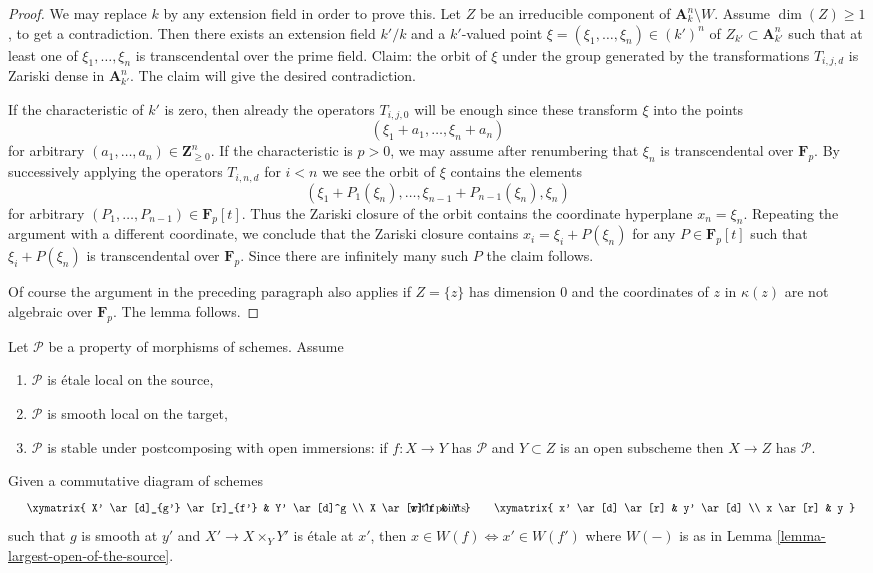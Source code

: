 \begin{proof}
We may replace $k$ by any extension field in order to prove this.
Let $Z$ be an irreducible component of $\mathbf{A}^n_k \setminus W$.
Assume $\dim(Z) \geq 1$, to get a contradiction.
Then there exists an extension field $k'/k$ and a $k'$-valued
point $\xi = (\xi_1, \ldots, \xi_n) \in (k')^n$ of
$Z_{k'} \subset \mathbf{A}^n_{k'}$
such that at least one of $\xi_1, \ldots, \xi_n$ is transcendental over the
prime field. Claim: the orbit of $\xi$ under the group generated by
the transformations $T_{i, j, d}$ is Zariski
dense in $\mathbf{A}^n_{k'}$. The claim will give the desired contradiction.

\medskip\noindent
If the characteristic of $k'$ is zero, then already the operators
$T_{i, j, 0}$ will be enough since these transform $\xi$ into
the points
$$
(\xi_1 + a_1, \ldots, \xi_n + a_n)
$$
for arbitrary $(a_1, \ldots, a_n) \in \mathbf{Z}_{\geq 0}^n$.
If the characteristic is $p > 0$, we may assume after renumbering
that $\xi_n$ is transcendental over $\mathbf{F}_p$. By
successively applying the operators $T_{i, n, d}$ for
$i < n$ we see the orbit of $\xi$ contains the elements
$$
(\xi_1 + P_1(\xi_n), \ldots, \xi_{n - 1} + P_{n - 1}(\xi_n), \xi_n)
$$
for arbitrary $(P_1, \ldots, P_{n - 1}) \in \mathbf{F}_p[t]$.
Thus the Zariski closure of the orbit contains the coordinate
hyperplane $x_n = \xi_n$. Repeating the argument with a different
coordinate, we conclude that the Zariski closure contains
$x_i = \xi_i + P(\xi_n)$ for any $P \in \mathbf{F}_p[t]$
such that $\xi_i + P(\xi_n)$ is transcendental over $\mathbf{F}_p$.
Since there are infinitely many such $P$ the claim follows.

\medskip\noindent
Of course the argument in the preceding paragraph also applies
if $Z = \{z\}$ has dimension $0$ and the coordinates of $z$
in $\kappa(z)$ are not algebraic over $\mathbf{F}_p$. The lemma follows.
\end{proof}

\begin{lemma}
\label{lemma-etale-tau-local-source-target}
Let $\mathcal{P}$ be a property of morphisms of schemes. Assume
\begin{enumerate}
\item $\mathcal{P}$ is \'etale local on the source,
\item $\mathcal{P}$ is smooth local on the target,
\item $\mathcal{P}$ is stable under postcomposing with open immersions:
if $f : X \to Y$ has $\mathcal{P}$ and $Y \subset Z$ is an open
subscheme then $X \to Z$ has $\mathcal{P}$.
\end{enumerate}
Given a commutative diagram of schemes
$$
\vcenter{
\xymatrix{
X' \ar[d]_{g'} \ar[r]_{f'} & Y' \ar[d]^g \\
X \ar[r]^f & Y
}
}
\quad\text{with points}\quad
\vcenter{
\xymatrix{
x' \ar[d] \ar[r] & y' \ar[d] \\
x \ar[r] & y
}
}
$$
such that $g$ is smooth at $y'$ and $X' \to X \times_Y Y'$ is \'etale
at $x'$, then $x \in W(f) \Leftrightarrow x' \in W(f')$
where $W(-)$ is as in Lemma \ref{lemma-largest-open-of-the-source}.
\end{lemma}

